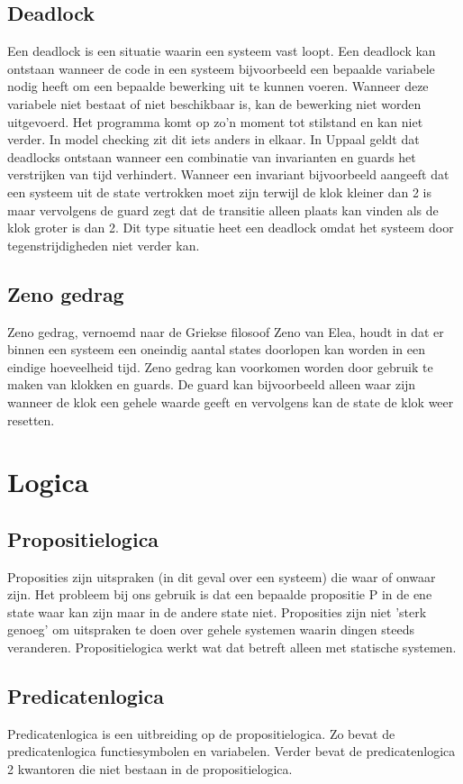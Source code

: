 \documentclass{article}
\begin{document}
\subsection{Deadlock}
Een deadlock is een situatie waarin een systeem vast loopt. Een deadlock kan ontstaan wanneer de code in een systeem bijvoorbeeld een bepaalde variabele nodig heeft om een bepaalde bewerking uit te kunnen voeren. Wanneer deze variabele niet bestaat of niet beschikbaar is, kan de bewerking niet worden uitgevoerd. Het programma komt op zo'n moment tot stilstand en kan niet verder.
In model checking zit dit iets anders in elkaar. In Uppaal geldt dat deadlocks ontstaan wanneer een combinatie van invarianten en guards het verstrijken van tijd verhindert. Wanneer een invariant bijvoorbeeld aangeeft dat een systeem uit de state vertrokken moet zijn terwijl de klok kleiner dan 2 is maar vervolgens de guard zegt dat de transitie alleen plaats kan vinden als de klok groter is dan 2. Dit type situatie heet een deadlock omdat het systeem door tegenstrijdigheden niet verder kan.

\subsection{Zeno gedrag}
Zeno gedrag, vernoemd naar de Griekse filosoof Zeno van Elea, houdt in dat er binnen een systeem een oneindig aantal states doorlopen kan worden in een eindige hoeveelheid tijd. Zeno gedrag kan voorkomen worden door gebruik te maken van klokken en guards. De guard kan bijvoorbeeld alleen waar zijn wanneer de klok een gehele waarde geeft en vervolgens kan de state de klok weer resetten. 

\section{Logica}

\subsection{Propositielogica}
Proposities zijn uitspraken (in dit geval over een systeem) die waar of onwaar zijn. Het probleem bij ons gebruik is dat een bepaalde propositie P in de ene state waar kan zijn maar in de andere state niet. Proposities zijn niet 'sterk genoeg' om uitspraken te doen over gehele systemen waarin dingen steeds veranderen. Propositielogica werkt wat dat betreft alleen met statische systemen.

\subsection{Predicatenlogica}
Predicatenlogica is een uitbreiding op de propositielogica. Zo bevat de predicatenlogica functiesymbolen en variabelen. Verder bevat de predicatenlogica 2 kwantoren die niet bestaan in de propositielogica.
\end{document}
